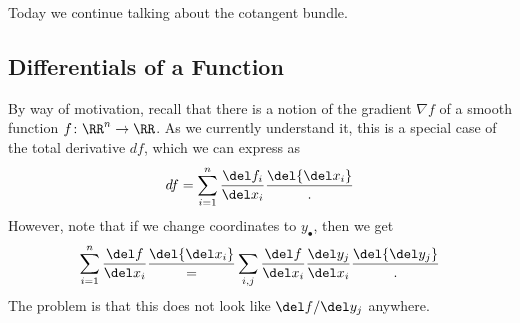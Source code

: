 \documentclass[../notes.tex]{subfiles}
\begin{document}
Today we continue talking about the cotangent bundle.

\subsection{Differentials of a Function}
By way of motivation, recall that there is a notion of the gradient $\nabla f$ of a smooth function $f\colon\RR^n\to\RR$. As we currently understand it, this is a special case of the total derivative $df$, which we can express as
\[df=\sum_{i=1}^n\frac{\del f_i}{\del x_i}\frac\del{\del x_i}.\]
However, note that if we change coordinates to $y_\bullet$, then we get
\[\sum_{i=1}^n\frac{\del f}{\del x_i}\frac\del{\del x_i}=\sum_{i,j}\frac{\del f}{\del x_i}\frac{\del y_j}{\del x_i}\frac\del{\del y_j}.\]
The problem is that this does not look like $\del f/\del y_j$ anywhere.
\end{document}

